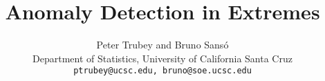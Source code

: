 \documentclass[12pt]{article}
\title{Anomaly Detection in Extremes}
\author{Peter Trubey and Bruno Sans\'o\\
Department of Statistics, University of California Santa Cruz\\
{\tt ptrubey@ucsc.edu, bruno@soe.ucsc.edu}}
\begin{document}
\maketitle
\thispagestyle{empty}
\begin{abstract}
  
\end{abstract}








% 













\end{document}
